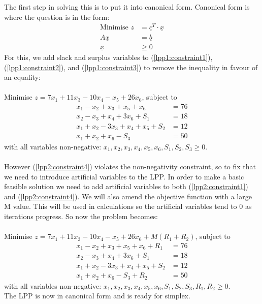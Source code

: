\documentclass{article}
\numberwithin{equation}{section}
\begin{document}
The first step in solving this is to put it into canonical form. Canonical form is where the question is in the form:
\begin{align}
    \text{Minimise }z &= \underline{c}^T \cdot \underline{x} \\
    A\underline{x} &= \underline{b} \\
    \underline{x} &\geq 0
\end{align}
For this, we add slack and surplus variables to (\ref{lpp1:constraint1}), (\ref{lpp1:constraint2}), and (\ref{lpp1:constraint3}) to remove the inequality in favour of an equality: \\ \\
Minimise $z = 7x_1 + 11x_3 - 10x_4 - x_5 + 26x_6$, subject to
\begin{align}
    x_1 - x_2 + x_3 + x_5 + x_6 &= 76 \label{lpp2:constraint1} \\
    x_2 - x_3 + x_4 + 3x_6 + S_1 &= 18 \label{lpp2:constraint2} \\
    x_1 + x_2 - 3x_3 + x_4 + x_5 + S_2 &= 12 \label{lpp2:constraint3} \\
    x_1 + x_2 + x_6 - S_3&= 50 \label{lpp2:constraint4}
\end{align}
with all variables non-negative: $x_1, x_2, x_3, x_4, x_5, x_6, S_1, S_2, S_3\geq 0$.\\ \\
However (\ref{lpp2:constraint4}) violates the non-negativity constraint, so to fix that we need to introduce artificial variables to the LPP. In order to make a basic feasible solution we need to add artificial variables to both (\ref{lpp2:constraint1}) and (\ref{lpp2:constraint4}). We will also amend the objective function with a large M value. This will be used in calculations so the artificial variables tend to 0 as iterations progress. So now the problem becomes: \\ \\
Minimise $z = 7x_1 + 11x_3 - 10x_4 - x_5 + 26x_6 + M(R_1 + R_2)$, subject to
\begin{align}
    x_1 - x_2 + x_3 + x_5 + x_6 + R_1&= 76 \\
    x_2 - x_3 + x_4 + 3x_6 + S_1 &= 18 \\
    x_1 + x_2 - 3x_3 + x_4 + x_5 + S_2 &= 12 \\
    x_1 + x_2 + x_6 - S_3 +R_2 &= 50
\end{align}
with all variables non-negative: $x_1, x_2, x_3, x_4, x_5, x_6, S_1, S_2, S_3, R_1, R_2\geq 0$.\\
\newpage
The LPP is now in canonical form and is ready for simplex.
\end{document}
